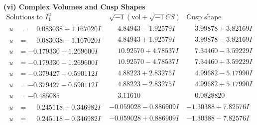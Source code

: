 \documentclass[1p]{elsarticle_modified}
\theoremstyle{definition}
\newcommand{\I}{\sqrt{-1}}
\begin{document}
\newpage\flushleft \textbf{(vi) Complex Volumes and Cusp Shapes}
$$\begin{array}{c|c|c}  
\text{Solutions to }I^u_{1}& \I (\text{vol} + \sqrt{-1}CS) & \text{Cusp shape}\\
 \hline 
\begin{aligned}
u &= \phantom{-}0.083038 + 1.167020 I\end{aligned}
 & \phantom{-}4.84943 - 1.92579 I & \phantom{-}3.99878 + 3.82169 I \\ \hline\begin{aligned}
u &= \phantom{-}0.083038 - 1.167020 I\end{aligned}
 & \phantom{-}4.84943 + 1.92579 I & \phantom{-}3.99878 - 3.82169 I \\ \hline\begin{aligned}
u &= -0.179330 + 1.269600 I\end{aligned}
 & \phantom{-}10.92570 + 4.78537 I & \phantom{-}7.34460 - 3.59229 I \\ \hline\begin{aligned}
u &= -0.179330 - 1.269600 I\end{aligned}
 & \phantom{-}10.92570 - 4.78537 I & \phantom{-}7.34460 + 3.59229 I \\ \hline\begin{aligned}
u &= -0.379427 + 0.590112 I\end{aligned}
 & \phantom{-}4.88223 + 2.83275 I & \phantom{-}4.99682 - 5.17990 I \\ \hline\begin{aligned}
u &= -0.379427 - 0.590112 I\end{aligned}
 & \phantom{-}4.88223 - 2.83275 I & \phantom{-}4.99682 + 5.17990 I \\ \hline\begin{aligned}
u &= -0.485085\phantom{ +0.000000I}\end{aligned}
 & \phantom{-}3.11610\phantom{ +0.000000I} & \phantom{-}0.0828820\phantom{ +0.000000I} \\ \hline\begin{aligned}
u &= \phantom{-}0.245118 + 0.346982 I\end{aligned}
 & -0.059028 - 0.886909 I & -1.30388 + 7.82576 I \\ \hline\begin{aligned}
u &= \phantom{-}0.245118 - 0.346982 I\end{aligned}
 & -0.059028 + 0.886909 I & -1.30388 - 7.82576 I \\ \hline\begin{aligned}

\end{aligned}
\end{array}$$
\end{document}
